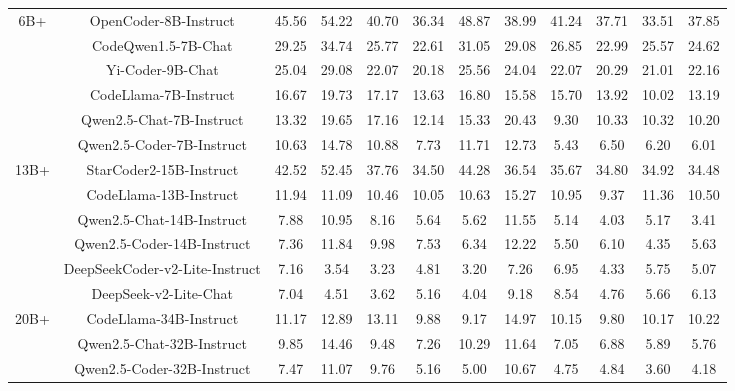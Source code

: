 \documentclass[11pt, a4paper, logo, copyright, nonumbering, amsart]{map}
\begin{document}
\begin{CJK*}{UTF8}{gbsn}
\begin{table*}[h!]
\begin{adjustbox}{width=\textwidth}
\begin{tabular}{c|c|cccccccccc}
    \midrule
    \multirow{6}{*}{6B+} 
    & OpenCoder-8B-Instruct & 45.56 & 54.22 & 40.70 & 36.34 & 48.87 & 38.99 & 41.24 & 37.71 & 33.51 & 37.85 \\
    & CodeQwen1.5-7B-Chat & 29.25 & 34.74 & 25.77 & 22.61 & 31.05 & 29.08 & 26.85 & 22.99 & 25.57 & 24.62 \\
    & Yi-Coder-9B-Chat & 25.04 & 29.08 & 22.07 & 20.18 & 25.56 & 24.04 & 22.07 & 20.29 & 21.01 & 22.16 \\
    & CodeLlama-7B-Instruct & 16.67 & 19.73 & 17.17 & 13.63 & 16.80 & 15.58 & 15.70 & 13.92 & 10.02 & 13.19 \\
    & Qwen2.5-Chat-7B-Instruct & 13.32 & 19.65 & 17.16 & 12.14 & 15.33 & 20.43 & 9.30 & 10.33 & 10.32 & 10.20 \\
    & Qwen2.5-Coder-7B-Instruct & 10.63 & 14.78 & 10.88 & 7.73 & 11.71 & 12.73 & 5.43 & 6.50 & 6.20 & 6.01 \\
    
    \midrule
    \multirow{6}{*}{13B+} 
    & StarCoder2-15B-Instruct & 42.52 & 52.45 & 37.76 & 34.50 & 44.28 & 36.54 & 35.67 & 34.80 & 34.92 & 34.48 \\
    & CodeLlama-13B-Instruct & 11.94 & 11.09 & 10.46 & 10.05 & 10.63 & 15.27 & 10.95 & 9.37 & 11.36 & 10.50 \\ 
    & Qwen2.5-Chat-14B-Instruct & 7.88 & 10.95 & 8.16 & 5.64 & 5.62 & 11.55 & 5.14 & 4.03 & 5.17 & 3.41 \\
    & Qwen2.5-Coder-14B-Instruct & 7.36 & 11.84 & 9.98 & 7.53 & 6.34 & 12.22 & 5.50 & 6.10 & 4.35 & 5.63 \\
    & DeepSeekCoder-v2-Lite-Instruct & 7.16 & 3.54 & 3.23 & 4.81 & 3.20 & 7.26 & 6.95 & 4.33 & 5.75 & 5.07 \\
    & DeepSeek-v2-Lite-Chat & 7.04 & 4.51 & 3.62 & 5.16 & 4.04 & 9.18 & 8.54 & 4.76 & 5.66 & 6.13 \\
    
    \midrule
    \multirow{3}{*}{20B+}
    & CodeLlama-34B-Instruct & 11.17 & 12.89 & 13.11 & 9.88 & 9.17 & 14.97 & 10.15 & 9.80 & 10.17 & 10.22 \\
    & Qwen2.5-Chat-32B-Instruct & 9.85 & 14.46 & 9.48 & 7.26 & 10.29 & 11.64 & 7.05 & 6.88 & 5.89 & 5.76 \\
    & Qwen2.5-Coder-32B-Instruct & 7.47 & 11.07 & 9.76 & 5.16 & 5.00 & 10.67 & 4.75 & 4.84 & 3.60 & 4.18 \\
    

\end{tabular}
\end{adjustbox}
\end{table*}
\end{CJK*}
\end{document}

